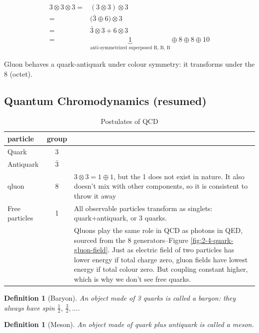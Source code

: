 \documentclass[]{article}
\newtheorem{defn}[thm]{Definition}
\begin{document}
\begin{align*}
3 \otimes 3 \otimes 3 =& (3 \otimes 3) \otimes 3\\
=& \big(\bar{3} \oplus 6 \big) \otimes 3\\
=& \bar{3}   \otimes 3 + 6 \otimes 3\\
=& \underbrace{1}_\text{anti-symmetrized superposed R, B, B} \oplus 8 \oplus 8 \oplus 10
\end{align*}

Gluon behaves a quark-antiquark under colour symmetry: it transforms under the 8 (octet).

\subsection{Quantum Chromodynamics (resumed)}

\begin{table}[H]
	\begin{center}
		\caption{Postulates of QCD}
		\begin{tabular}{|l|c|p{8cm}|} \hline
			particle&group& \\ \hline
			Quark&3& \\ \hline
			Antiquark&$\bar{3}$& \\ \hline
			qluon&8&$3\otimes3=1\oplus1$, but the 1 does not exist in nature. It also doesn't mix with other components, so it is consistent to throw it away \\ \hline
			Free particles&1&All observable particles transform as singlets: quark+antiquark, or 3 quarks.\\ \hline
			&&Qluons play the same role in QCD as photons in QED, sourced from the 8 generators--Figure \ref{fig:2-4-quark-gluon-field}. Just as electric field of two particles has lower energy if total charge zero, gluon fields have lowest energy if total colour zero. But coupling constant higher, which is why we don't see free quarks.\\ \hline
		\end{tabular}
	\end{center}
\end{table}

\begin{defn}[Baryon]
	An object made of 3 quarks is called a baryon: they always have spin $\frac{1}{2}$, $\frac{3}{2},...$.
\end{defn}

\begin{defn}[Meson]
	An object made of quark plus antiquark is called a meson.
\end{defn}
\end{document}
